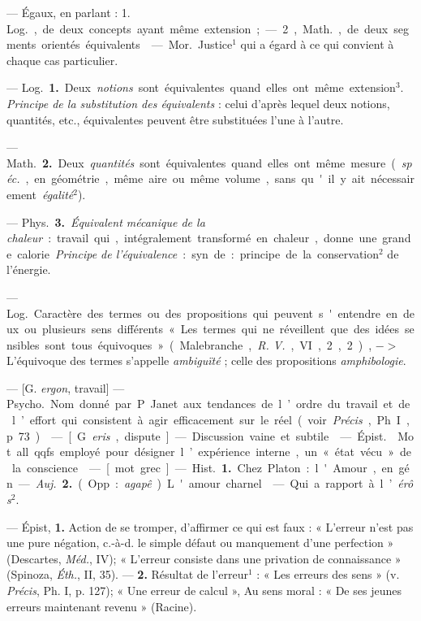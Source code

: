 \begin{itemize}[leftmargin=1cm, label=, itemsep=1pt]
 — Égaux, en parlant :
1. \si{Log.}, de deux concepts ayant
même extension ; — 2, \si{Math.}, de
deux segments orientés équivalents.

 — \si{Mor.} Justice$^1$ qui a égard
à ce qui convient à chaque cas particulier.

 — \si{Log.} {\bf 1.} Deux {\it notions}
sont équivalentes quand elles ont
même extension$^3$. {\it Principe de la
substitution des équivalents} : celui
d’après lequel deux notions, quantités, etc., équivalentes peuvent être
substituées l’une à l’autre.

— \si{Math.} {\bf 2.} Deux {\it quantités} sont
équivalentes quand elles ont même
mesure ({\it spéc.}, en géométrie, même
aire ou même volume, sans qu'il y
ait nécessairement {\it égalité}$^2$).

— \si{Phys.} {\bf 3.} {\it Équivalent mécanique de la
chaleur} : travail qui, intégralement transformé en chaleur, donne
une grande calorie. {\it Principe de
l’équivalence} : syn. de : principe de
la conservation$^2$ de l’énergie.

 — \si{Log.} Caractère des
termes ou des propositions qui peuvent s'entendre en deux ou plusieurs
sens différents « Les termes qui ne
réveillent que des idées sensibles
sont tous équivoques » (Malebranche, {\it R. V.}, VI, 2, 2), $->$
L'équivoque des termes s'appelle
{\it ambiguïté} ; celle des propositions
{\it amphibologie}.

 — [G. {\it ergon},
travail] — \si{Psycho.} Nom donné par
P. Janet aux tendances de l’ordre
du travail et de l’effort qui consistent à agir efficacement sur le réel
(voir  {\it Précis}, Ph. I, p. 73).

 — [G. {\it eris}, dispute] — Discussion vaine et subtile.

 — \si{Épist.}  Mot all. qqfs
employé pour désigner l’expérience
interne, un « état vécu » de la conscience.

 — [mot grec] — \si{Hist.} {\bf 1.} Chez
Platon : l'Amour, en gén. — {\it Auj.}
 {\bf 2.} (Opp. : {\it agapê}). L'amour charnel.

 — Qui a rapport à l’{\it érôs}$^2$.

 — Épist, {\bf 1.}  Action de se
tromper, d'affirmer ce qui est faux :
« L'erreur n’est pas une pure négation, c.-à-d. le simple défaut ou
manquement d'une perfection »
(Descartes, {\it Méd.}, IV); « L'erreur
consiste dans une privation de connaissance » (Spinoza, {\it Éth.}, II, 35).
— {\bf 2.}  Résultat de l'erreur$^1$ : « Les erreurs
des sens » (v.  {\it Précis}, Ph. I, p. 127); « Une erreur de calcul »,
Au sens moral : « De ses jeunes erreurs maintenant revenu » (Racine).


\end{itemize}
